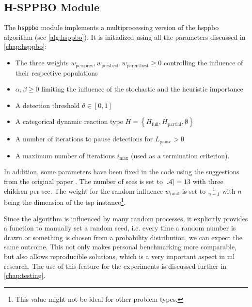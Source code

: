 \subsection{H-SPPBO Module}
\label{chap:hsppbo-module}
The \texttt{hsppbo} module implements a multiprocessing version of the \gls{hsppbo} algorithm (see \ref{alg:hsppbo}). It is initialized using all the parameters discussed in \cref{chap:hsppbo}:
\begin{itemize}
	\item The three weights $w_{\text{persprev}}, w_{\text{persbest}}, w_{\text{parentbest}} \geq 0$ controlling the influence of their respective populations
	\item $\alpha, \beta \geq 0$ limiting the influence of the stochastic and the heuristic importance
	\item A detection threshold $\theta \in [0,1]$
	\item A categorical dynamic reaction type $H = \left\lbrace H_{\text{full}}, H_{\text{partial}}, \emptyset \right\rbrace$
	\item A number of iterations to pause detections for $L_\text{pause} > 0$
	\item A maximum number of iterations $i_{\text{max}}$ (used as a termination criterion).
\end{itemize}

In addition, some parameters have been fixed in the code using the suggestions from the original paper \cite{kupfer2021hierarchical}. The number of \glspl{sce} is set to $|\mathcal{A}| = 13$ with three children per \gls{sce}. The weight for the random influence $w_\text{rand}$ is set to $\frac{1}{n-1}$ with $n$ being the dimension of the \gls{tsp} instance\footnote{This value might not be ideal for other problem types.}.

Since the algorithm is influenced by many random processes, it explicitly provides a function to manually set a random seed, i.e. every time a random number is drawn or something is chosen from a probability distribution, we can expect the same outcome. This not only makes personal benchmarking more comparable, but also allows reproducible solutions, which is a very important aspect in \gls{ml} research. The use of this feature for the experiments is discussed further in \cref{chap:testing}.


